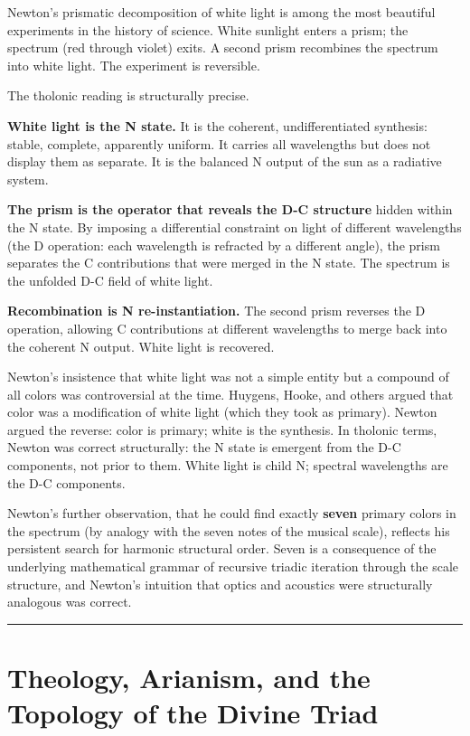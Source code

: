 \documentclass[12pt]{article}
\begin{document}
Newton's prismatic decomposition of white light is among the most
beautiful experiments in the history of science. White sunlight enters a
prism; the spectrum (red through violet) exits. A second prism
recombines the spectrum into white light. The experiment is reversible.

The tholonic reading is structurally precise.

\textbf{White light is the N state.} It is the coherent,
undifferentiated synthesis: stable, complete, apparently uniform. It
carries all wavelengths but does not display them as separate. It is the
balanced N output of the sun as a radiative system.

\textbf{The prism is the operator that reveals the D-C structure} hidden
within the N state. By imposing a differential constraint on light of
different wavelengths (the D operation: each wavelength is refracted by
a different angle), the prism separates the C contributions that were
merged in the N state. The spectrum is the unfolded D-C field of white
light.

\textbf{Recombination is N re-instantiation.} The second prism reverses
the D operation, allowing C contributions at different wavelengths to
merge back into the coherent N output. White light is recovered.

Newton's insistence that white light was not a simple entity but a
compound of all colors was controversial at the time. Huygens, Hooke,
and others argued that color was a modification of white light (which
they took as primary). Newton argued the reverse: color is primary;
white is the synthesis. In tholonic terms, Newton was correct
structurally: the N state is emergent from the D-C components, not prior
to them. White light is child N; spectral wavelengths are the D-C
components.

Newton's further observation, that he could find exactly \textbf{seven}
primary colors in the spectrum (by analogy with the seven notes of the
musical scale), reflects his persistent search for harmonic structural
order. Seven is a consequence of the underlying mathematical grammar of
recursive triadic iteration through the scale structure, and Newton's
intuition that optics and acoustics were structurally analogous was
correct.

\begin{center}\rule{0.5\linewidth}{0.5pt}\end{center}

\section{Theology, Arianism, and the Topology of the Divine Triad}\label{theology-arianism-and-the-topology-of-the-divine-triad}
\end{document}

